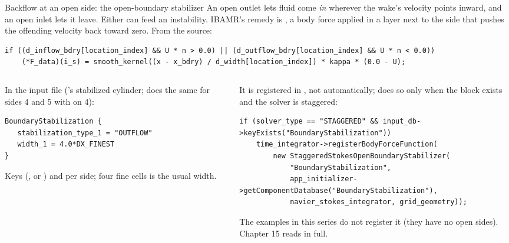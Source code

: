 \documentclass[aspectratio=169,11pt]{beamer}
\begin{document}
\begin{frame}[fragile]{Backflow at an open side: the open-boundary stabilizer}
\label{fr:stab}
\small An open outlet lets fluid come \emph{in} wherever the wake's velocity points inward, and an open inlet lets it leave. Either can feed an instability. IBAMR's remedy is , a body force applied in a layer next to the side that pushes the offending velocity back toward zero. From the source:
\begin{lstlisting}[style=cpptiny]
if ((d_inflow_bdry[location_index] && U * n > 0.0) || (d_outflow_bdry[location_index] && U * n < 0.0))
    (*F_data)(i_s) = smooth_kernel((x - x_bdry) / d_width[location_index]) * kappa * (0.0 - U);
\end{lstlisting}
\begin{columns}[T,onlytextwidth]
\begin{column}{0.46\textwidth}
\footnotesize In the input file ('s stabilized cylinder;  does the same for sides 4 and 5 with  on 4):
\begin{lstlisting}[style=inputtiny]
BoundaryStabilization {
   stabilization_type_1 = "OUTFLOW"
   width_1 = 4.0*DX_FINEST
}
\end{lstlisting}
\footnotesize Keys  (,  or ) and  per side; four fine cells is the usual width.
\end{column}
\begin{column}{0.52\textwidth}
\footnotesize It is registered in , not automatically;  does so only when the block exists and the solver is staggered:
\begin{lstlisting}[style=cpptiny]
if (solver_type == "STAGGERED" && input_db->keyExists("BoundaryStabilization"))
    time_integrator->registerBodyForceFunction(
        new StaggeredStokesOpenBoundaryStabilizer(
            "BoundaryStabilization",
            app_initializer->getComponentDatabase("BoundaryStabilization"),
            navier_stokes_integrator, grid_geometry));
\end{lstlisting}
\footnotesize The examples in this series do not register it (they have no open sides). Chapter 15 reads  in full.
\end{column}
\end{columns}
\end{frame}
\end{document}
